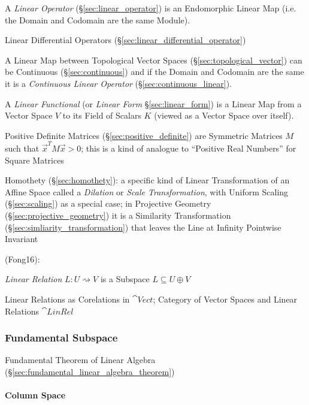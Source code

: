 A \emph{Linear Operator} (\S\ref{sec:linear_operator}) is an Endomorphic Linear
Map (i.e. the Domain and Codomain are the same Module).

\fist Linear Differential Operators (\S\ref{sec:linear_differential_operator})

A Linear Map between Topological Vector Spaces
(\S\ref{sec:topological_vector}) can be Continuous
(\S\ref{sec:continuous}) and if the Domain and Codomain are the same
it is a \emph{Continuous Linear Operator} (\S\ref{sec:continuous_linear}).

A \emph{Linear Functional} (or \emph{Linear Form} \S\ref{sec:linear_form}) is a
Linear Map from a Vector Space $V$ to its Field of Scalars $K$ (viewed as a
Vector Space over itself).

Positive Definite Matrices (\S\ref{sec:positive_definite}) are Symmetric
Matrices $M$ such that $\vec{x}^T M \vec{x} > 0$; this is a kind of analogue to
``Positive Real Numbers'' for Square Matrices

Homothety (\S\ref{sec:homothety}): a specific kind of Linear Transformation of
an Affine Space called a \emph{Dilation} or \emph{Scale Transformation}, with
Uniform Scaling (\S\ref{sec:scaling}) as a special case; in Projective Geometry
(\S\ref{sec:projective_geometry}) it is a Similarity Transformation
(\S\ref{sec:simliarity_transformation}) that leaves the Line at Infinity
Pointwise Invariant

(Fong16):


\emph{Linear Relation} $L : U \rightsquigarrow V$ is a Subspace $L
\subseteq U \oplus V$

Linear Relations as Corelations in $\cat{Vect}$; Category of Vector
Spaces and Linear Relations $\cat{LinRel}$



\subsubsection{Fundamental Subspace}\label{sec:fundamental_subspace}

\fist Fundamental Theorem of Linear Algebra
(\S\ref{sec:fundamental_linear_algebra_theorem})



\paragraph{Column Space}\label{sec:column_space}\hfill

